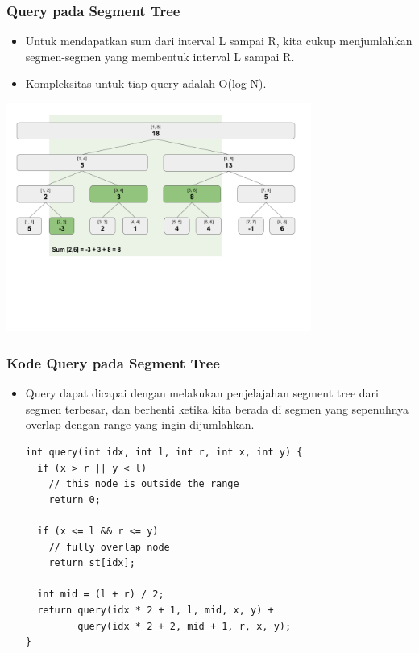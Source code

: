 \begin{frame}
\frametitle{Query pada Segment Tree}
\begin{itemize}
  \item Untuk mendapatkan sum dari interval L sampai R, kita cukup menjumlahkan segmen-segmen yang membentuk interval L sampai R.
  \item Kompleksitas untuk tiap query adalah O(log N).
\end{itemize}
\begin{center}
  \includegraphics[width=10cm]{asset/segtree-sum.png}
\end{center}
\end{frame}

\begin{frame}[fragile]
\frametitle{Kode Query pada Segment Tree}
\begin{itemize}
  \item Query dapat dicapai dengan melakukan penjelajahan segment tree dari segmen terbesar, dan berhenti ketika kita berada di segmen yang sepenuhnya overlap dengan range yang ingin dijumlahkan.
  \begin{lstlisting}
int query(int idx, int l, int r, int x, int y) {
  if (x > r || y < l)
    // this node is outside the range
    return 0;

  if (x <= l && r <= y)
    // fully overlap node
    return st[idx];
  
  int mid = (l + r) / 2;
  return query(idx * 2 + 1, l, mid, x, y) + 
         query(idx * 2 + 2, mid + 1, r, x, y);
}
\end{lstlisting}
\end{itemize}
\end{frame}

